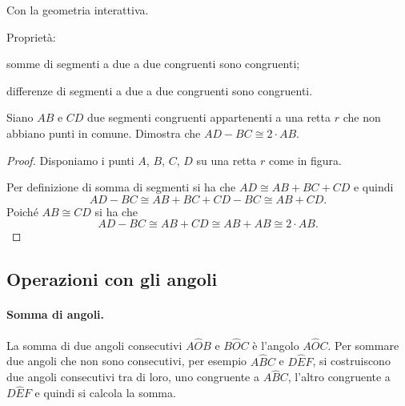 \ifcoding
Con la geometria interattiva.


\fi

Proprietà:
\begin{itemize*}
\item somme di segmenti a due a due congruenti sono congruenti; 
\item differenze di segmenti a due a due congruenti sono congruenti.
\end{itemize*}

\begin{exrig}
\begin{esempio}
Siano \(AB\) e \(CD\) due segmenti congruenti appartenenti a una retta 
\(r\) che non abbiano punti in comune. Dimostra che \(AD-BC\cong 2\cdot 
AB\).
\begin{proof}
Disponiamo i punti \(A\), \(B\), \(C\), \(D\) su una retta \(r\) come in figura.

\begin{inaccessibleblock}
\begin{center}\end{center}
\end{inaccessibleblock}

Per definizione di somma di segmenti si ha che \(AD\cong AB+BC+CD\) e 
quindi
\[AD-BC\cong AB+BC+CD-BC\cong AB+CD.\]
Poiché \(AB\cong CD\) si ha che
\[AD-BC\cong AB+CD\cong AB+AB\cong 2\cdot AB.\]
\end{proof}
\end{esempio}
\end{exrig}

\subsection{Operazioni con gli angoli}

\paragraph{Somma di angoli.} La somma di due angoli consecutivi 
\(A\widehat{O}B\) e \(B\widehat{O}C\) è l'angolo \(A\widehat{O}C\). Per 
sommare due angoli che non sono consecutivi, per esempio 
\(A\widehat{B}C\) e \(D\widehat{E}F\), si costruiscono due angoli 
consecutivi tra di loro, uno congruente a \(A\widehat{B}C\), l'altro 
congruente a \(D\widehat{E}F\) e quindi si calcola la somma.


